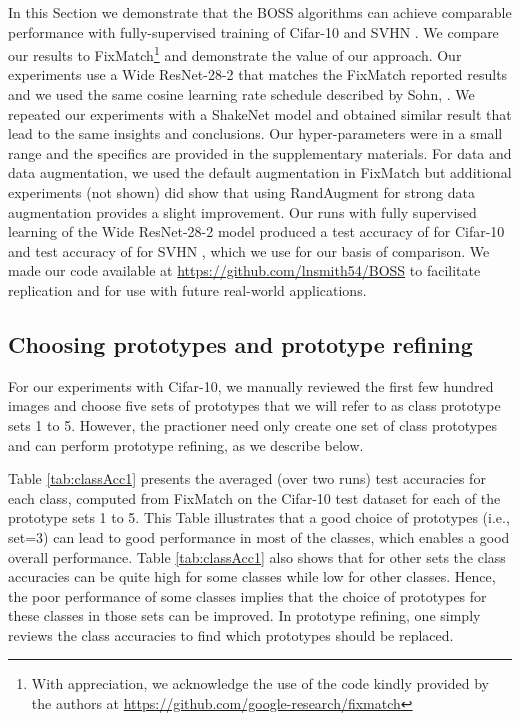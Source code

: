 \documentclass[final]{cvpr}
\begin{document}
In this Section we demonstrate that the BOSS algorithms can achieve comparable performance with fully-supervised training of Cifar-10 \cite{krizhevsky2009learning} and SVHN \cite{netzer2011reading}.
We compare our results to FixMatch\footnote{With appreciation, we acknowledge the use of the code kindly provided by the authors at \url{https://github.com/google-research/fixmatch} } \cite{sohn2020fixmatch} and demonstrate the value of our approach.
Our experiments use a Wide ResNet-28-2 \cite{zagoruyko2016wide} that matches the FixMatch reported results and we used the same cosine learning rate schedule described by Sohn, \etal \cite{sohn2020fixmatch}. 
We repeated our experiments with a ShakeNet model \cite{gastaldi2017shake} and obtained similar result that lead to the same insights and conclusions.
Our hyper-parameters were in a small range and the specifics are provided in the supplementary materials.
For data and data augmentation, we used the default augmentation in FixMatch but additional experiments (not shown) did show that using RandAugment \cite{cubuk2019randaugment} for strong data augmentation provides  a slight improvement.
Our runs with fully supervised learning of the Wide ResNet-28-2 model produced a test accuracy of  for Cifar-10 \cite{krizhevsky2009learning} and  test accuracy of  for SVHN \cite{netzer2011reading}, which we use for our basis of comparison.
We made our code available at \url{https://github.com/lnsmith54/BOSS} to facilitate replication and for use with future real-world applications.




\subsection{Choosing prototypes and prototype refining}
\label{sec:expPrto}

For our experiments with Cifar-10, we manually reviewed the first few hundred images and choose five sets of prototypes that we will refer to as class prototype sets 1 to 5.
However, the practioner need only create one set of class prototypes and can perform prototype refining, as we describe below.

Table \ref{tab:classAcc1} presents the averaged (over two runs) test accuracies for each class, computed from FixMatch on the Cifar-10 test dataset for each of the prototype sets 1 to 5.
This Table illustrates that a good choice of prototypes (i.e., set=3) can lead to good performance in most of the classes, which enables a good overall performance.
Table \ref{tab:classAcc1} also shows that for other sets the class accuracies can be quite high for some classes while low for other classes.
Hence, the poor performance of some classes implies that the choice of prototypes for these classes in those sets can be improved.
In prototype refining, one simply reviews the class accuracies to find which prototypes should be replaced.
\end{document}
